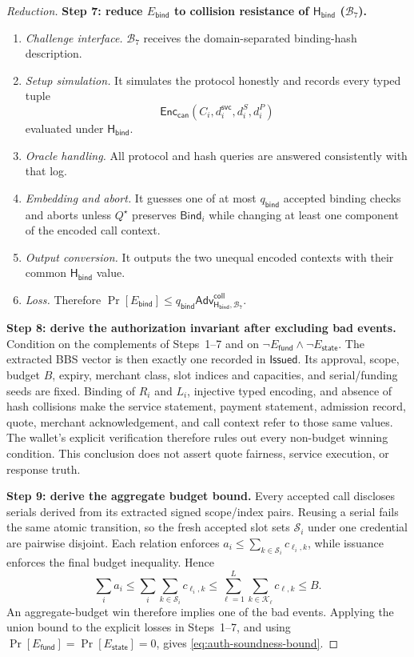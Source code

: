 \documentclass[letterpaper]{article}
\newcommand{\hashBind}{\mathsf{H}_{\mathsf{bind}}}
\newcommand{\Adv}{\mathsf{Adv}}
\begin{document}
\begin{proof}[Reduction]
\textbf{Step 7: reduce \(E_{\mathsf{bind}}\) to collision resistance of
\(\hashBind\) (\(\mathcal B_7\)).}
\begin{enumerate}
  \item \emph{Challenge interface.} \(\mathcal B_7\) receives the
  domain-separated binding-hash description.
  \item \emph{Setup simulation.} It simulates the protocol honestly and records
  every typed tuple
  \[
    \mathsf{Enc}_{\mathsf{can}}(C_i,d_i^{\mathsf{svc}},d_i^S,d_i^P)
  \]
  evaluated under \(\hashBind\).
  \item \emph{Oracle handling.} All protocol and hash queries are answered
  consistently with that log.
  \item \emph{Embedding and abort.} It guesses one of at most
  \(q_{\mathsf{bind}}\) accepted binding checks and aborts unless
  \(Q^\star\) preserves \(\mathsf{Bind}_i\) while changing at least one
  component of the encoded call context.
  \item \emph{Output conversion.} It outputs the two unequal encoded contexts
  with their common \(\hashBind\) value.
  \item \emph{Loss.} Therefore
  \(\Pr[E_{\mathsf{bind}}]\le
  q_{\mathsf{bind}}\Adv^{\mathsf{coll}}_{\hashBind,\mathcal B_7}\).
\end{enumerate}

\textbf{Step 8: derive the authorization invariant after excluding bad
events.}
Condition on the complements of Steps~1--7 and on
\(\neg E_{\mathsf{fund}}\wedge\neg E_{\mathsf{state}}\). The extracted BBS
vector is then exactly one
recorded in \(\mathsf{Issued}\). Its approval, scope, budget \(B\), expiry,
merchant class, slot indices and capacities, and serial/funding seeds are
fixed. Binding of \(R_i\) and \(L_i\), injective typed encoding, and absence of
hash collisions make the service statement, payment statement, admission
record, quote, merchant acknowledgement, and call context refer to those same values.
The wallet's explicit verification therefore rules out every non-budget
winning condition. This conclusion does not assert quote fairness, service
execution, or response truth.

\textbf{Step 9: derive the aggregate budget bound.}
Every accepted call discloses serials derived from its extracted signed
scope/index pairs. Reusing a serial fails the same atomic transition, so the
fresh accepted slot sets \(\mathcal S_i\) under one credential are pairwise
disjoint. Each relation enforces
\(a_i\le\sum_{k\in\mathcal S_i}c_{\ell_i,k}\), while issuance enforces the final
budget inequality. Hence
\begin{equation}
\sum_i a_i
\le\sum_i\sum_{k\in\mathcal S_i}c_{\ell_i,k}
\le\sum_{\ell=1}^{L}\sum_{k\in\mathcal K_\ell}c_{\ell,k}
\le B.
\label{eq:soundness-budget-chain}
\end{equation}
An aggregate-budget win therefore implies one of the bad events. Applying the
union bound to the explicit losses in Steps~1--7, and using
\(\Pr[E_{\mathsf{fund}}]=\Pr[E_{\mathsf{state}}]=0\), gives
\cref{eq:auth-soundness-bound}.
\end{proof}
\end{document}
